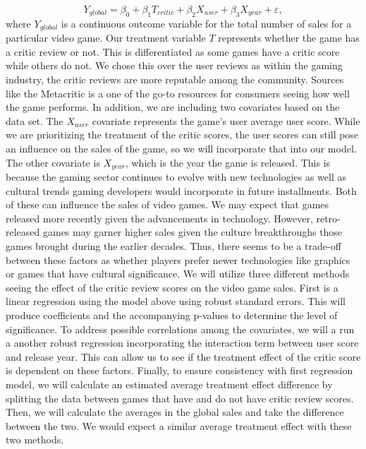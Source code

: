 \documentclass[12pt,english]{article}
\begin{document}
\begin{equation}
\label{eq:1}
    Y_{global} = \beta_{0} + \beta_{1}T_{critic} + \beta_{2} X_{user} + \beta_{3} X_{year} + \varepsilon,
\end{equation}
where $Y_{global}$ is a continuous outcome variable for the total number of sales for a particular video game. Our treatment variable $T$ represents whether the game has a critic review or not. This is differentiated as some games have a critic score while others do not. We chose this over the user reviews as within the gaming industry, the critic reviews are more reputable among the community. Sources like the Metacritic is a one of the go-to resources for consumers seeing how well the game performs. In addition, we are including two covariates based on the data set. The $X_{user}$ covariate represents the game's user average user score. While we are prioritizing the treatment of the critic scores, the user scores can still pose an influence on the sales of the game, so we will incorporate that into our model. The other covariate is $X_{year}$, which is the year the game is released. This is because the gaming sector continues to evolve with new technologies as well as cultural trends gaming developers would incorporate in future installments. Both of these can influence the sales of video games. We may expect that games released more recently given the advancements in technology. However, retro-released games may garner higher sales given the culture breakthroughs those games brought during the earlier decades. Thus, there seems to be a trade-off between these factors as whether players prefer newer technologies like graphics or games that have cultural significance. We will utilize three different methods seeing the effect of the critic review scores on the video game sales. First is a linear regression using the model above using robust standard errors. This will produce coefficients and the accompanying p-values to determine the level of significance. To address possible correlations among the covariates, we will a run a another robust regression incorporating the interaction term between user score and release year. This can allow us to see if the treatment effect of the critic score is dependent on these factors. Finally, to ensure consistency with first regression model, we will calculate an estimated average treatment effect difference by splitting the data between games that have and do not have critic review scores. Then, we will calculate the averages in the global sales and take the difference between the two. We would expect a similar average treatment effect with these two methods. 
\end{document}
